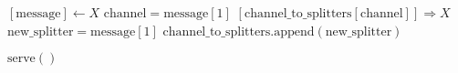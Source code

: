 \documentclass{article}
\begin{document}
\pagestyle{empty}

\newcommand{\send}{\Rightarrow}
\newcommand{\sendto}{\rightarrow}
\newcommand{\recv}{\Leftarrow}
\algrenewcommand\textproc{\textrm}

\begin{algorithmic}

  \algrenewcommand{}
  
  \algrenewcommand{}
  \State $[\text{message}] \gets X$
  \State $\text{channel} = \text{message}[1]$
  \State $[\text{channel\_to\_splitters}[\text{channel}]] \send X$
  \Else {}
  \State $\text{new\_splitter} = \text{message}[1]$
  \State $\text{channel\_to\_splitters}.\text{append}(\text{new\_splitter})$
  \EndIf
  \EndIf
  \EndWhile
  \EndProcedure

  \State $\text{serve}()$
  \EndFunction
  
  \EndProcedure
\end{algorithmic}
\end{document}
